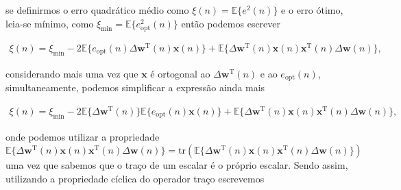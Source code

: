\documentclass[a4paper,10pt]{article}
\begin{document}
\begin{enumerate}
\begin{enumerate}
						se definirmos o erro quadrático médio como $\xi(n) = \mathbb{E}\{e^{2}(n)\}$ e o erro ótimo, leia-se mínimo, como $\xi_{\text{min}} = \mathbb{E}\{e^{2}_{\text{opt}}(n)\}$
						então podemos escrever
						
						\begin{align}
							\xi(n) = \xi_{\text{min}} - 2 \mathbb{E}\{e_{\text{opt}}(n) \Delta \mathbf{w}^{\text{T}}(n) \mathbf{x}(n)\} + \mathbb{E}\{\Delta \mathbf{w}^{\text{T}}(n) \mathbf{x}(n) \mathbf{x}^{\text{T}}(n) \Delta \mathbf{w}(n)\},
						\end{align}

						considerando mais uma vez que $\mathbf{x}$ é ortogonal ao $\Delta \mathbf{w}^{\text{T}}(n)$ e ao $e_{\text{opt}}(n)$, simultaneamente, podemos simplificar a expressão ainda mais 

						\begin{align}
							\xi(n) = \xi_{\text{min}} - 2 \mathbb{E}\{\Delta \mathbf{w}^{\text{T}}(n)\} \mathbb{E}\{e_{\text{opt}}(n) \mathbf{x}(n)\} + \mathbb{E}\{\Delta \mathbf{w}^{\text{T}}(n) \mathbf{x}(n) \mathbf{x}^{\text{T}}(n) \Delta \mathbf{w}(n)\},
						\end{align}

						onde podemos utilizar a propriedade $\mathbb{E}\{\Delta \mathbf{w}^{\text{T}}(n) \mathbf{x}(n) \mathbf{x}^{\text{T}}(n) \Delta \mathbf{w}(n)\} = \text{tr}(\mathbb{E}\{\Delta \mathbf{w}^{\text{T}}(n) \mathbf{x}(n) \mathbf{x}^{\text{T}}(n) \Delta \mathbf{w}(n)\})$ uma vez
						que sabemos que o traço de um escalar é o próprio escalar. Sendo assim, utilizando a propriedade cíclica do operador traço escrevemos


\end{enumerate}
\end{enumerate}
\end{document}
